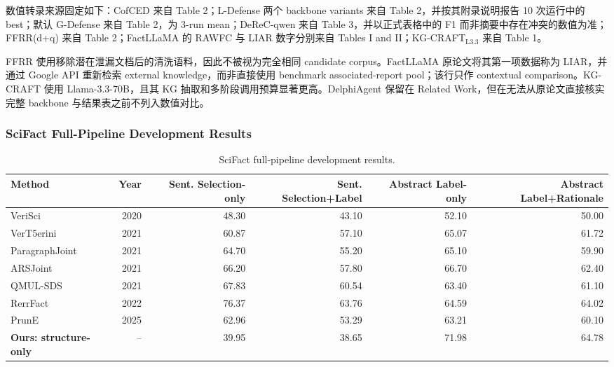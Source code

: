 \documentclass[letterpaper]{article}
\begin{document}
数值转录来源固定如下：CofCED 来自 \citet{Yang2022CofCED} Table 2；L-Defense 两个 backbone variants 来自 \citet{Wang2024LDefense} Table 2，并按其附录说明报告 10 次运行中的 best；默认 G-Defense 来自 \citet{Wang2026GDefense} Table 2，为 3-run mean；DeReC-qwen 来自 \citet{Qazi2025DeReC} Table 3，并以正式表格中的 F1 而非摘要中存在冲突的数值为准；FFRR(d+q) 来自 \citet{Zhang2024FFRR} Table 2；FactLLaMA 的 RAWFC 与 LIAR 数字分别来自 \citet{Cheung2023FactLLaMA} Tables I and II；KG-CRAFT$_{\mathrm{L3.3}}$ 来自 \citet{Lourenco2026KGCRAFT} Table 1。

FFRR 使用移除潜在泄漏文档后的清洗语料，因此不被视为完全相同 candidate corpus。FactLLaMA 原论文将其第一项数据称为 LIAR，并通过 Google API 重新检索 external knowledge，而非直接使用 benchmark associated-report pool；该行只作 contextual comparison。KG-CRAFT 使用 Llama-3.3-70B，且其 KG 抽取和多阶段调用预算显著更高。DelphiAgent 保留在 Related Work，但在无法从原论文直接核实完整 backbone 与结果表之前不列入数值对比。

\subsubsection{SciFact Full-Pipeline Development Results}

\begin{table}[t]
\centering
\small
\setlength{\tabcolsep}{3.5pt}
\renewcommand{\arraystretch}{1.08}
\caption{SciFact full-pipeline development results.}
\label{tab:scifact-results}
\begin{tabularx}{\textwidth}{@{}Y r r r r r@{}}
\toprule
\textbf{Method} & \textbf{Year} & \textbf{Sent. Selection-only} & \textbf{Sent. Selection+Label} & \textbf{Abstract Label-only} & \textbf{Abstract Label+Rationale} \\
\midrule
VeriSci \citep{Wadden2020SciFact} & 2020 & 48.30 & 43.10 & 52.10 & 50.00 \\
VerT5erini \citep{Pradeep2021VerT5erini} & 2021 & 60.87 & 57.10 & 65.07 & 61.72 \\
ParagraphJoint \citep{Li2021ParagraphJoint} & 2021 & 64.70 & 55.20 & 65.10 & 59.90 \\
ARSJoint \citep{Zhang2021ARSJoint} & 2021 & 66.20 & 57.80 & 66.70 & 62.40 \\
QMUL-SDS \citep{Zeng2021QMULSDS} & 2021 & 67.83 & 60.54 & 63.40 & 61.10 \\
RerrFact \citep{Rana2022RerrFact} & 2022 & 76.37 & 63.76 & 64.59 & 64.02 \\
PrunE \citep{Fang2025PrunE} & 2025 & 62.96 & 53.29 & 63.21 & 60.10 \\
\textbf{Ours: structure-only} & -- & 39.95 & 38.65 & 71.98 & 64.78 \\
\bottomrule
\end{tabularx}
\end{table}
\end{document}
